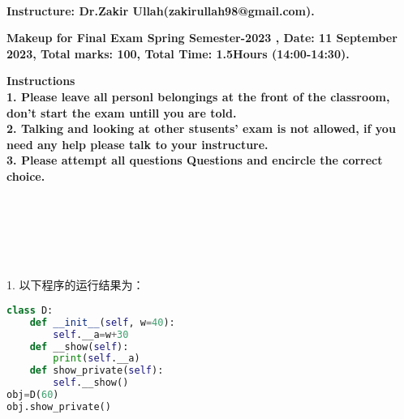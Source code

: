 \documentclass[6pt]{article}
\begin{document}
\large
\begin{center}
\\
\vspace{40pt}
\bf Instructure: Dr.Zakir Ullah(zakirullah98@gmail.com).\\
\vspace{40pt}
\end       {center}

\vspace{40pt}
\begin{center}

\bf Makeup for Final Exam Spring Semester-2023  , Date: 11 September 2023, Total marks: 100,  Total Time: 1.5Hours (14:00-14:30).
\end{center}
\vspace{5pt}
\vspace{40pt}


\large
\bf Instructions \\
\small
1. Please leave all personl belongings at the front of the classroom, don't  start the exam untill you are told.\\
2. Talking and looking at other stusents'  exam is not allowed, if you need any help please talk to your  instructure.\\
3. Please attempt all questions Questions and  encircle the correct choice.\\
\large
\vspace{20pt}




\\
\vspace{20pt}

\\
\vspace{20pt}

\\

\vspace{300pt}


1. 以下程序的运行结果为：\\

\begin{lstlisting}[language=Python]
class D:
    def __init__(self, w=40):
        self.__a=w+30
    def __show(self):
        print(self.__a)
    def show_private(self):
        self.__show()
obj=D(60)
obj.show_private()
\end{lstlisting}
\end{document}
